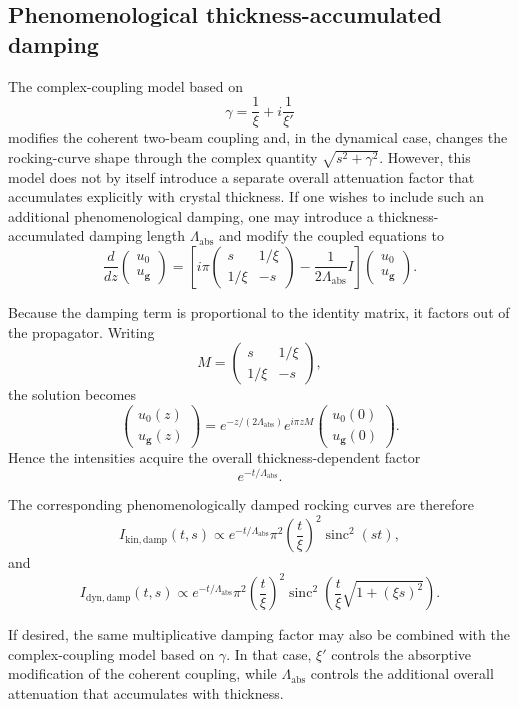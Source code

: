 \documentclass[11pt]{article}
\begin{document}
\subsection{Phenomenological thickness-accumulated damping}

The complex-coupling model based on
\[
\gamma=\frac{1}{\xi}+i\frac{1}{\xi'}
\]
modifies the coherent two-beam coupling and, in the dynamical case, changes the rocking-curve
shape through the complex quantity \(\sqrt{s^2+\gamma^2}\). However, this model does not by
itself introduce a separate overall attenuation factor that accumulates explicitly with crystal
thickness. If one wishes to include such an additional phenomenological damping, one may
introduce a thickness-accumulated damping length \(\Lambda_{\mathrm{abs}}\) and modify the
coupled equations to
\[
\frac{d}{dz}
\begin{pmatrix}
u_0\\
u_{\mathbf g}
\end{pmatrix}
=
\left[
i\pi
\begin{pmatrix}
s & 1/\xi\\
1/\xi & -s
\end{pmatrix}
-\frac{1}{2\Lambda_{\mathrm{abs}}}I
\right]
\begin{pmatrix}
u_0\\
u_{\mathbf g}
\end{pmatrix}.
\]

Because the damping term is proportional to the identity matrix, it factors out of the
propagator. Writing
\[
M=
\begin{pmatrix}
s & 1/\xi\\
1/\xi & -s
\end{pmatrix},
\]
the solution becomes
\[
\begin{pmatrix}
u_0(z)\\
u_{\mathbf g}(z)
\end{pmatrix}
=
e^{-z/(2\Lambda_{\mathrm{abs}})}
e^{i\pi zM}
\begin{pmatrix}
u_0(0)\\
u_{\mathbf g}(0)
\end{pmatrix}.
\]
Hence the intensities acquire the overall thickness-dependent factor
\[
e^{-t/\Lambda_{\mathrm{abs}}}.
\]

The corresponding phenomenologically damped rocking curves are therefore
\[
I_{\mathrm{kin,damp}}(t,s)
\propto
e^{-t/\Lambda_{\mathrm{abs}}}
\pi^2\left(\frac{t}{\xi}\right)^2
\operatorname{sinc}^2(st),
\]
and
\[
I_{\mathrm{dyn,damp}}(t,s)
\propto
e^{-t/\Lambda_{\mathrm{abs}}}
\pi^2\left(\frac{t}{\xi}\right)^2
\operatorname{sinc}^2\!\left(
\frac{t}{\xi}\sqrt{1+(\xi s)^2}
\right).
\]

If desired, the same multiplicative damping factor may also be combined with the complex-coupling
model based on \(\gamma\). In that case, \(\xi'\) controls the absorptive modification of the
coherent coupling, while \(\Lambda_{\mathrm{abs}}\) controls the additional overall attenuation
that accumulates with thickness.


\end{document}

